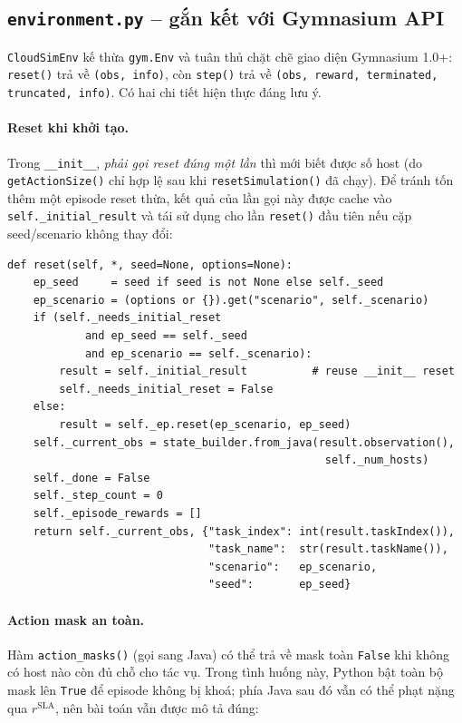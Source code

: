 \subsection{\texttt{environment.py} -- gắn kết với Gymnasium API}
\label{ssec:impl-env}

\texttt{CloudSimEnv} kế thừa \texttt{gym.Env} và tuân thủ chặt chẽ
giao diện Gymnasium 1.0+: \texttt{reset()} trả về
\texttt{(obs, info)}, còn \texttt{step()} trả về
\texttt{(obs, reward, terminated, truncated, info)}. Có hai chi tiết
hiện thực đáng lưu ý.

\paragraph{Reset khi khởi tạo.} Trong \texttt{\_\_init\_\_},
\emph{phải gọi reset đúng một lần} thì mới biết được số host (do
\texttt{getActionSize()} chỉ hợp lệ sau khi
\texttt{resetSimulation()} đã chạy). Để tránh tốn thêm một episode
reset thừa, kết quả của lần gọi này được cache vào
\texttt{self.\_initial\_result} và tái sử dụng cho lần
\texttt{reset()} đầu tiên nếu cặp seed/scenario không thay đổi:

\begin{lstlisting}[style=pythonstyle, caption={\texttt{CloudSimEnv.reset}
-- tránh reset thừa lần đầu.}, label={lst:env-reset}]
def reset(self, *, seed=None, options=None):
    ep_seed     = seed if seed is not None else self._seed
    ep_scenario = (options or {}).get("scenario", self._scenario)
    if (self._needs_initial_reset
            and ep_seed == self._seed
            and ep_scenario == self._scenario):
        result = self._initial_result          # reuse __init__ reset
        self._needs_initial_reset = False
    else:
        result = self._ep.reset(ep_scenario, ep_seed)
    self._current_obs = state_builder.from_java(result.observation(),
                                                 self._num_hosts)
    self._done = False
    self._step_count = 0
    self._episode_rewards = []
    return self._current_obs, {"task_index": int(result.taskIndex()),
                               "task_name":  str(result.taskName()),
                               "scenario":   ep_scenario,
                               "seed":       ep_seed}
\end{lstlisting}

\paragraph{Action mask an toàn.} Hàm \texttt{action\_masks()} (gọi
sang Java) có thể trả về mask toàn \texttt{False} khi không có host
nào còn đủ chỗ cho tác vụ. Trong tình huống này, Python bật toàn bộ
mask lên \texttt{True} để episode không bị khoá; phía Java sau đó vẫn
có thể phạt nặng qua $r^{\mathrm{SLA}}$, nên bài toán vẫn được mô tả
đúng:

